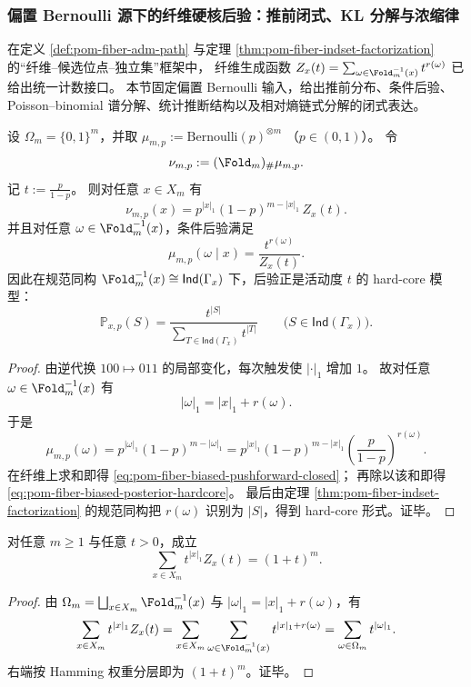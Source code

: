 \subsubsection{偏置 Bernoulli 源下的纤维硬核后验：推前闭式、KL 分解与浓缩律}\label{subsubsec:pom-fiber-biased-bernoulli-hardcore}
在定义 \ref{def:pom-fiber-adm-path} 与定理 \ref{thm:pom-fiber-indset-factorization} 的“纤维--候选位点--独立集”框架中，
纤维生成函数
\(
Z_x(t)=\sum_{\omega\in\Fold_m^{-1}(x)}t^{r(\omega)}
\)
已给出统一计数接口。
本节固定偏置 Bernoulli 输入，给出推前分布、条件后验、Poisson--binomial 谱分解、统计推断结构以及相对熵链式分解的闭式表达。

\begin{theorem}\label{thm:pom-fiber-biased-bernoulli-pushforward-hardcore}
设 \(\Omega_m=\{0,1\}^m\)，并取
\(
\mu_{m,p}:=\mathrm{Bernoulli}(p)^{\otimes m}
\)
（\(p\in(0,1)\)）。
令
\[
\nu_{m,p}:=(\Fold_m)_{\#}\mu_{m,p}.
\]
记
\(
t:=\frac{p}{1-p}
\)。
则对任意 \(x\in X_m\) 有
\begin{equation}\label{eq:pom-fiber-biased-pushforward-closed}
\nu_{m,p}(x)
=
p^{|x|_1}(1-p)^{m-|x|_1}\,Z_x(t).
\end{equation}
并且对任意 \(\omega\in\Fold_m^{-1}(x)\)，条件后验满足
\begin{equation}\label{eq:pom-fiber-biased-posterior-hardcore}
\mu_{m,p}(\omega\mid x)
=
\frac{t^{r(\omega)}}{Z_x(t)}.
\end{equation}
因此在规范同构
\(
\Fold_m^{-1}(x)\cong \mathsf{Ind}(\Gamma_x)
\)
下，后验正是活动度 \(t\) 的 hard-core 模型：
\[
\mathbb P_{x,p}(S)=\frac{t^{|S|}}{\sum_{T\in\mathsf{Ind}(\Gamma_x)}t^{|T|}}
\qquad
\bigl(S\in\mathsf{Ind}(\Gamma_x)\bigr).
\]
\end{theorem}
\begin{proof}
由逆代换 \(100\mapsto 011\) 的局部变化，每次触发使 \(|\cdot|_1\) 增加 \(1\)。
故对任意 \(\omega\in\Fold_m^{-1}(x)\) 有
\[
|\omega|_1=|x|_1+r(\omega).
\]
于是
\[
\mu_{m,p}(\omega)
=p^{|\omega|_1}(1-p)^{m-|\omega|_1}
=p^{|x|_1}(1-p)^{m-|x|_1}\left(\frac{p}{1-p}\right)^{r(\omega)}.
\]
在纤维上求和即得
\eqref{eq:pom-fiber-biased-pushforward-closed}；
再除以该和即得
\eqref{eq:pom-fiber-biased-posterior-hardcore}。
最后由定理 \ref{thm:pom-fiber-indset-factorization} 的规范同构把 \(r(\omega)\) 识别为 \(|S|\)，得到 hard-core 形式。证毕。
\end{proof}

\begin{theorem}[权重--纤维生成函数的二项式守恒律]\label{thm:pom-fiber-biased-weighted-partition-identity}
对任意 \(m\ge 1\) 与任意 \(t>0\)，成立
\begin{equation}\label{eq:pom-fiber-biased-binomial-conservation}
\sum_{x\in X_m} t^{|x|_1}Z_x(t)=(1+t)^m.
\end{equation}
\end{theorem}
\begin{proof}
由 \(\Omega_m=\bigsqcup_{x\in X_m}\Fold_m^{-1}(x)\) 与
\(
|\omega|_1=|x|_1+r(\omega)
\)，有
\[
\sum_{x\in X_m} t^{|x|_1}Z_x(t)
=\sum_{x\in X_m}\sum_{\omega\in\Fold_m^{-1}(x)}t^{|x|_1+r(\omega)}
=\sum_{\omega\in\Omega_m}t^{|\omega|_1}.
\]
右端按 Hamming 权重分层即为 \((1+t)^m\)。证毕。
\end{proof}


